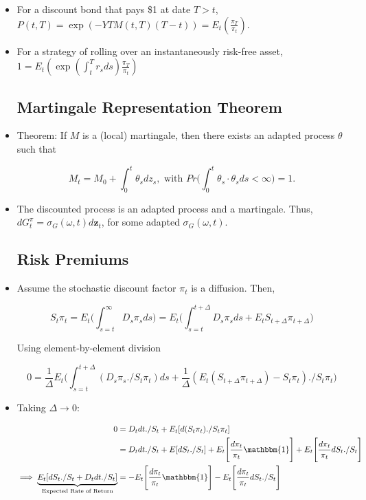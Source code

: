 \documentclass{article}
\newcommand{\zbf}{\mathbf{z}}
\newcommand{\onebf}{\mathbbm{1}}
\begin{document}
\begin{itemize}
\item For a discount bond that pays \$1 at date $T > t$, $P(t, T) = \exp(-YTM(t, T)(T-t)) = E_t (\frac{\pi_T}{\pi_t})$.

\item For a strategy of rolling over an instantaneously risk-free asset, $1 = E_t(\exp(\int_t^T r_s ds) \frac{\pi_T}{\pi_t})$

\subsection*{Martingale Representation Theorem}

\item Theorem: If $M$ is a (local) martingale, then there exists an adapted process $\theta$ such that 

$$
M_t = M_0 + \int_0^t \theta_s dz_s, \text{ with } Pr\Bigg(\int_0^t \theta_s \cdot \theta_s ds < \infty\Bigg) = 1.
$$

\item The discounted process is an adapted process and a martingale.  Thus, $dG_t^\pi = \sigma_G(\omega, t) d \zbf_t$, for some adapted $\sigma_G(\omega, t)$.

\subsection*{Risk Premiums}

\item Assume the stochastic discount factor $\pi_t$ is a diffusion. Then,

$$
S_t \pi_t = E_t \Bigg(\int_{s=t}^\infty D_s \pi_s ds\Bigg) = E_t \Bigg(\int_{s=t}^{t + \Delta} D_s \pi_s ds + E_t S_{t+\Delta} \pi_{t + \Delta}\Bigg)
$$

Using element-by-element division

$$
0 = \frac{1}{\Delta} E_t\Bigg( \int_{s=t}^{t + \Delta} (D_s \pi_s ./ S_t \pi_t) ds + \frac{1}{\Delta}(E_t(S_{t+ \Delta} \pi_{t+\Delta}) - S_t \pi_t) ./ S_t \pi_t\Bigg)
$$

\item Taking $\Delta \to 0$:

\begin{align*}
0 &= D_t dt ./S_t + E_t[d(S_t\pi_t)./S_t\pi_t] \\
&= D_t dt ./S_t + E[dS_t./S_t] + E_t\Bigg[\frac{d\pi_t}{\pi_t} \onebf\Bigg] + E_t\Bigg[\frac{d\pi_t}{\pi_t} dS_t ./S_t\Bigg]\\
\implies
\underbrace{E_t[dS_t./S_t + D_t dt ./S_t]}_{\text{Expected Rate of Return}} &= - E_t\Bigg[\frac{d\pi_t}{\pi_t} \onebf\Bigg] - E_t\Bigg[\frac{d\pi_t}{\pi_t} dS_t ./S_t\Bigg]
\end{align*}


\end{itemize}
\end{document}
